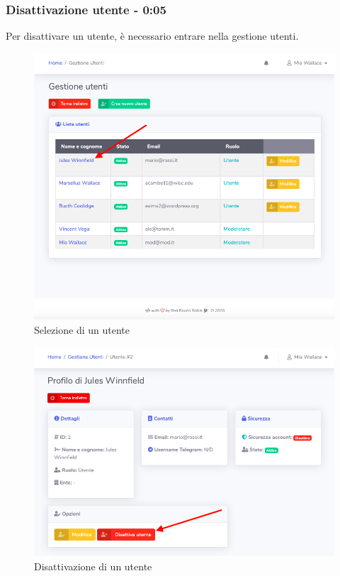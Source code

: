 	\subsubsection{Disattivazione utente - 0:05}
	Per disattivare un utente, è necessario entrare nella gestione utenti.
		\begin{figure}[H]
		\centering
		\includegraphics[scale=0.600]{res/images/mod/selUtente.png}
		\caption{Selezione di un utente}
	\end{figure}
	\begin{figure}[H]
		\centering
		\includegraphics[scale=0.600]{res/images/mod/elimUtente.png}
		\caption{Disattivazione di un utente}
	\end{figure}
